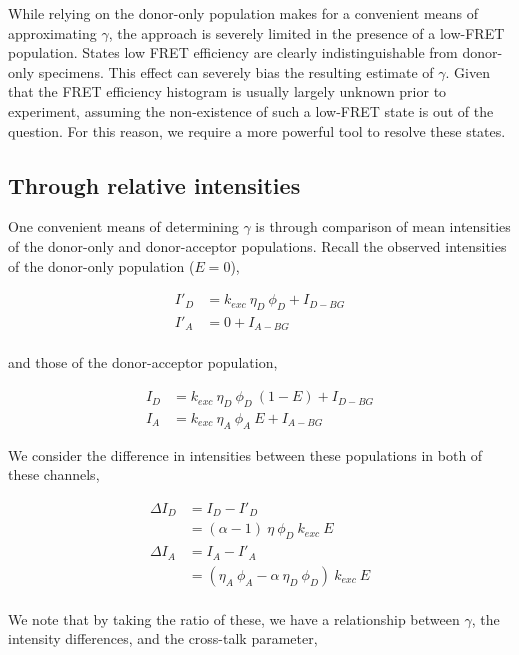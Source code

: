\documentclass{article}
\begin{document}
While relying on the donor-only population makes for a convenient
means of approximating $\gamma$, the approach is severely limited in
the presence of a low-FRET population. States low FRET efficiency are
clearly indistinguishable from donor-only specimens. This effect can
severely bias the resulting estimate of $\gamma$. Given that the FRET
efficiency histogram is usually largely unknown prior to experiment,
assuming the non-existence of such a low-FRET state is out of the
question. For this reason, we require a more powerful tool to resolve
these states.

\subsection{Through relative intensities}

One convenient means of determining $\gamma$ is through comparison of 
mean intensities of the donor-only and donor-acceptor populations. 
Recall the observed intensities of the donor-only population ($E=0$),

\begin{align*}
I'_D & = k_{exc} ~ \eta_D ~ \phi_D  + I_{D-BG} \\
I'_A & = 0                         + I_{A-BG} \\
\end{align*}

and those of the donor-acceptor population,

\begin{align*}
I_D & = k_{exc} ~ \eta_D ~ \phi_D ~ (1 - E) + I_{D-BG} \\
I_A & = k_{exc} ~ \eta_A ~ \phi_A ~ E       + I_{A-BG} 
\end{align*}

We consider the difference in intensities between these populations
in both of these channels,

\begin{align*}
  \Delta I_D
  & = I_D - I'_D \\
  & = (\alpha - 1) ~ \eta ~ \phi_D ~ k_{exc} ~ E \\
  \Delta I_A
  & = I_A - I'_A \\
  & = (\eta_A ~ \phi_A - \alpha~\eta_D~\phi_D) ~ k_{exc} ~ E \\
\end{align*}

We note that by taking the ratio of these, we have a relationship between
$\gamma$, the intensity differences, and the cross-talk parameter,
\end{document}
